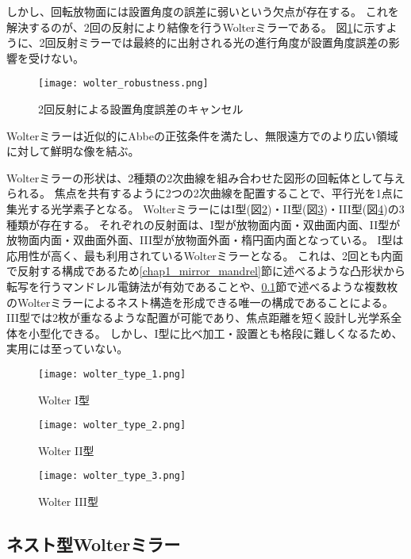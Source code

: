 しかし、回転放物面には設置角度の誤差に弱いという欠点が存在する。
これを解決するのが、2回の反射により結像を行うWolterミラーである。
図\ref{fig:wolter_robustness}に示すように、2回反射ミラーでは最終的に出射される光の進行角度が設置角度誤差の影響を受けない。

\begin{figure}[b]
\centering
\caption{2回反射による設置角度誤差のキャンセル}
\texttt{[image: wolter\_robustness.png]}
\label{fig:wolter_robustness}
\end{figure}

Wolterミラーは近似的にAbbeの正弦条件を満たし、無限遠方でのより広い領域に対して鮮明な像を結ぶ。\cite{VanSpeybroeck1972}

Wolterミラーの形状は、2種類の2次曲線を組み合わせた図形の回転体として与えられる。
焦点を共有するように2つの2次曲線を配置することで、平行光を1点に集光する光学素子となる。
WolterミラーにはI型(図\ref{fig:wolter_type_1})・II型(図\ref{fig:wolter_type_2})・III型(図\ref{fig:wolter_type_3})の3種類が存在する。
それぞれの反射面は、I型が放物面内面・双曲面内面、II型が放物面内面・双曲面外面、III型が放物面外面・楕円面内面となっている。
I型は応用性が高く、最も利用されているWolterミラーとなる。
これは、2回とも内面で反射する構成であるため\ref{chap1_mirror_mandrel}節に述べるような凸形状から転写を行うマンドレル電鋳法が有効であることや、\ref{chap1_nested_wolter_mirror}節で述べるような複数枚のWolterミラーによるネスト構造を形成できる唯一の構成であることによる。
III型では2枚が重なるような配置が可能であり、焦点距離を短く設計し光学系全体を小型化できる。
しかし、I型に比べ加工・設置とも格段に難しくなるため、実用には至っていない。

\begin{figure}[b]
\centering
\texttt{[image: wolter\_type\_1.png]}
\caption{Wolter I型}
\label{fig:wolter_type_1}
\end{figure}

\begin{figure}[b]
\centering
\texttt{[image: wolter\_type\_2.png]}
\caption{Wolter II型}
\label{fig:wolter_type_2}
\end{figure}

\begin{figure}[b]
\centering
\texttt{[image: wolter\_type\_3.png]}
\caption{Wolter III型}
\label{fig:wolter_type_3}
\end{figure}

\subsection{ネスト型Wolterミラー}
\label{chap1_nested_wolter_mirror}

